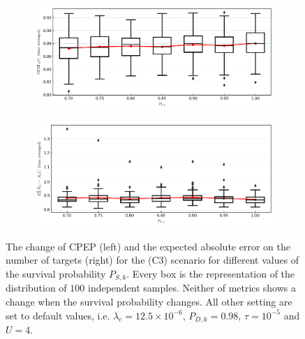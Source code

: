 \begin{figure}
    \centering
    \begin{subfigure}[]{0.48\linewidth}
        \centering
        \includegraphics[width=\linewidth]{figures/c3-ps-cpep.png}
    \end{subfigure}
    \hfill
    \begin{subfigure}[]{0.48\linewidth}
        \centering
        \includegraphics[width=\linewidth]{figures/c3-ps-eae.png}
    \end{subfigure}
  \caption[(C3). Change of performance depending on the survival probability.]{The change of CPEP (left) and the expected absolute error on the number of targets (right) for the (C3) scenario for different values of the survival probability $P_{S,k}$. Every box is the representation of the distribution of $100$ independent samples. Neither of metrics shows a change when the survival probability changes. All other setting are set to default values, i.e. $\lambda_{c} = 12.5 \times 10^{-6}$, $P_{D,k} = 0.98$, $\tau = 10^{-5}$ and $U = 4$.}
  \label{fig:c3-ps}
\end{figure}

